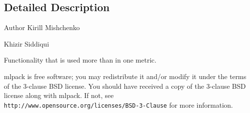 \subsection{Detailed Description}
\begin{DoxyAuthor}{Author}
Kirill Mishchenko 

Khizir Siddiqui
\end{DoxyAuthor}
Functionality that is used more than in one metric.

mlpack is free software; you may redistribute it and/or modify it under the terms of the 3-\/clause B\+SD license. You should have received a copy of the 3-\/clause B\+SD license along with mlpack. If not, see {\tt http\+://www.\+opensource.\+org/licenses/\+B\+S\+D-\/3-\/\+Clause} for more information. 